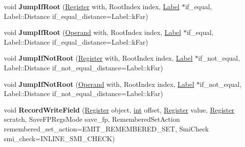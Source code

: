 \begin{DoxyCompactItemize}
\mbox{\label{classv8_1_1internal_1_1MacroAssembler_a0c0a34e88bc94afc76f4a9caa7241832}} 
void {\bfseries Jump\+If\+Root} (\mbox{\hyperlink{classv8_1_1internal_1_1Register}{Register}} with, Root\+Index index, \mbox{\hyperlink{classv8_1_1internal_1_1Label}{Label}} $\ast$if\+\_\+equal, Label\+::\+Distance if\+\_\+equal\+\_\+distance=Label\+::k\+Far)
\item 
\mbox{\label{classv8_1_1internal_1_1MacroAssembler_ab072c6b5583b4f07a0fceb4b4cf0548f}} 
void {\bfseries Jump\+If\+Root} (\mbox{\hyperlink{classv8_1_1internal_1_1Operand}{Operand}} with, Root\+Index index, \mbox{\hyperlink{classv8_1_1internal_1_1Label}{Label}} $\ast$if\+\_\+equal, Label\+::\+Distance if\+\_\+equal\+\_\+distance=Label\+::k\+Far)
\item 
\mbox{\label{classv8_1_1internal_1_1MacroAssembler_a48b83c64473d71b01f907c1d14116fb2}} 
void {\bfseries Jump\+If\+Not\+Root} (\mbox{\hyperlink{classv8_1_1internal_1_1Register}{Register}} with, Root\+Index index, \mbox{\hyperlink{classv8_1_1internal_1_1Label}{Label}} $\ast$if\+\_\+not\+\_\+equal, Label\+::\+Distance if\+\_\+not\+\_\+equal\+\_\+distance=Label\+::k\+Far)
\item 
\mbox{\label{classv8_1_1internal_1_1MacroAssembler_a6450abf9d6db3be64ed1d3f0f1671b7b}} 
void {\bfseries Jump\+If\+Not\+Root} (\mbox{\hyperlink{classv8_1_1internal_1_1Operand}{Operand}} with, Root\+Index index, \mbox{\hyperlink{classv8_1_1internal_1_1Label}{Label}} $\ast$if\+\_\+not\+\_\+equal, Label\+::\+Distance if\+\_\+not\+\_\+equal\+\_\+distance=Label\+::k\+Far)
\item 
\mbox{\label{classv8_1_1internal_1_1MacroAssembler_af5a27c24fb0d0688548e6ea7b0144792}} 
void {\bfseries Record\+Write\+Field} (\mbox{\hyperlink{classv8_1_1internal_1_1Register}{Register}} object, \mbox{\hyperlink{classint}{int}} offset, \mbox{\hyperlink{classv8_1_1internal_1_1Register}{Register}} value, \mbox{\hyperlink{classv8_1_1internal_1_1Register}{Register}} scratch, Save\+F\+P\+Regs\+Mode save\+\_\+fp, Remembered\+Set\+Action remembered\+\_\+set\+\_\+action=E\+M\+I\+T\+\_\+\+R\+E\+M\+E\+M\+B\+E\+R\+E\+D\+\_\+\+S\+ET, Smi\+Check smi\+\_\+check=I\+N\+L\+I\+N\+E\+\_\+\+S\+M\+I\+\_\+\+C\+H\+E\+CK)

\end{DoxyCompactItemize}
